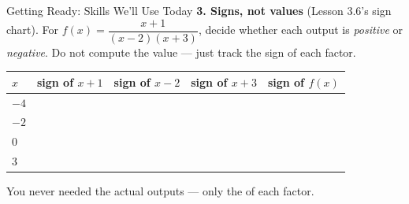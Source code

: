 \documentclass[10pt]{article}
\begin{document}
\begin{notesbox}{Getting Ready: Skills We'll Use Today}
\vspace{4pt}
\textbf{3. Signs, not values} (Lesson 3.6's sign chart). For $f(x)=\dfrac{x+1}{(x-2)(x+3)}$, decide
whether each output is \emph{positive} or \emph{negative}. Do not compute the value --- just track the
sign of each factor.
\begin{center}
\renewcommand{\arraystretch}{1.5}
\begin{tabularx}{0.94\linewidth}{|C{1.6cm}|C{2.0cm}|C{2.0cm}|C{2.0cm}|X|}
\hline
{}
\textbf{$x$} & \textbf{sign of $x+1$} & \textbf{sign of $x-2$} & \textbf{sign of $x+3$} &
\textbf{sign of $f(x)$} \\ \hline
$-4$ & & & & \\ \hline
$-2$ & & & & \\ \hline
$0$  & & & & \\ \hline
$3$  & & & & \\ \hline
\end{tabularx}
\end{center}
\vspace{-2pt}
You never needed the actual outputs --- only the \blank{2.0cm} of each factor.

\end{notesbox}
\end{document}
